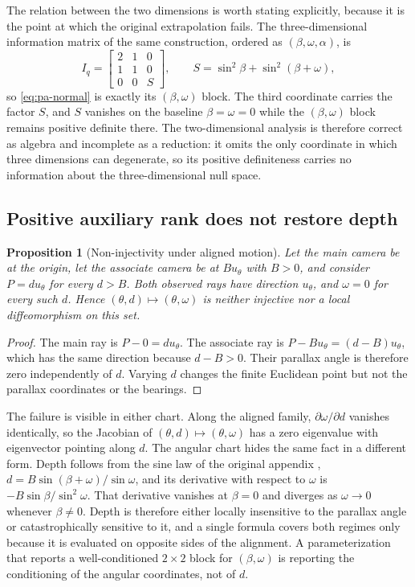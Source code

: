 \documentclass[11pt,a4paper]{article}
\let\cite\citep
\newtheorem{proposition}[theorem]{Proposition}
\theoremstyle{definition}
\theoremstyle{remark}
\begin{document}
The relation between the two dimensions is worth stating explicitly, because it is the point at which the original extrapolation fails. The three-dimensional information matrix of the same construction, ordered as $(\beta,\omega,\alpha)$, is
\begin{equation}
I_q=
\begin{bmatrix}
2&1&0\\
1&1&0\\
0&0&S
\end{bmatrix},
\qquad
S=\sin^{2}\beta+\sin^{2}(\beta+\omega),
\label{eq:iq-3d}
\end{equation}
so \eqref{eq:pa-normal} is exactly its $(\beta,\omega)$ block. The third coordinate carries the factor $S$, and $S$ vanishes on the baseline $\beta=\omega=0$ while the $(\beta,\omega)$ block remains positive definite there. The two-dimensional analysis is therefore correct as algebra and incomplete as a reduction: it omits the only coordinate in which three dimensions can degenerate, so its positive definiteness carries no information about the three-dimensional null space.

\subsection{Positive auxiliary rank does not restore depth}
\begin{proposition}[Non-injectivity under aligned motion]
\label{prop:noninjective}
Let the main camera be at the origin, let the associate camera be at $B u_\theta$ with $B>0$, and consider $P=d u_\theta$ for every $d>B$. Both observed rays have direction $u_\theta$, and $\omega=0$ for every such $d$. Hence $(\theta,d)\mapsto(\theta,\omega)$ is neither injective nor a local diffeomorphism on this set.
\end{proposition}
\begin{proof}
The main ray is $P-0=d u_\theta$. The associate ray is $P-Bu_\theta=(d-B)u_\theta$, which has the same direction because $d-B>0$. Their parallax angle is therefore zero independently of $d$. Varying $d$ changes the finite Euclidean point but not the parallax coordinates or the bearings.
\end{proof}

The failure is visible in either chart. Along the aligned family, $\partial\omega/\partial d$ vanishes identically, so the Jacobian of $(\theta,d)\mapsto(\theta,\omega)$ has a zero eigenvalue with eigenvector pointing along $d$. The angular chart hides the same fact in a different form. Depth follows from the sine law of the original appendix \cite{zhao2015parallaxba}, $d=B\sin(\beta+\omega)/\sin\omega$, and its derivative with respect to $\omega$ is $-B\sin\beta/\sin^{2}\omega$. That derivative vanishes at $\beta=0$ and diverges as $\omega\to0$ whenever $\mbox{$\beta\neq0$}$. Depth is therefore either locally insensitive to the parallax angle or catastrophically sensitive to it, and a single formula covers both regimes only because it is evaluated on opposite sides of the alignment. A parameterization that reports a well-conditioned $2\times2$ block for $(\beta,\omega)$ is reporting the conditioning of the angular coordinates, not of $d$.
\end{document}
